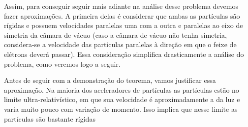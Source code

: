 Assim, para conseguir seguir mais adiante na análise desse problema devemos fazer aproximações. A primeira delas é considerar que ambas as partículas são rígidas e possuem velocidades paralelas uma com a outra e paralelas ao eixo de simetria da câmara de vácuo (caso a câmara de vácuo não tenha simetria, considera-se a velocidade das partículas paralelas à direção em que o feixe de elétrons deverá passar). Essa consideração simplifica drasticamente a análise do problema, como veremos logo a seguir.

Antes de seguir com a demonstração do teorema, vamos justificar essa aproximação. Na maioria dos aceleradores de partículas as partículas estão no limite ultra-relativístico, em que sua velocidade é aproximadamente a da luz e varia muito pouco com variação de momento. Isso implica que nesse limite as partículas são bastante rígidas

